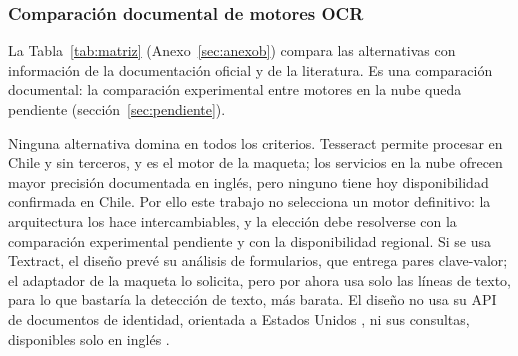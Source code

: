 \documentclass[11pt,a4paper]{article}
\begin{document}
\subsubsection{Comparación documental de motores OCR}
La Tabla~\ref{tab:matriz} (Anexo~\ref{sec:anexob}) compara las alternativas con información de la documentación oficial y de la literatura. Es una comparación documental: la comparación experimental entre motores en la nube queda pendiente (sección~\ref{sec:pendiente}).

Ninguna alternativa domina en todos los criterios. Tesseract permite procesar en Chile y sin terceros, y es el motor de la maqueta; los servicios en la nube ofrecen mayor precisión documentada en inglés, pero ninguno tiene hoy disponibilidad confirmada en Chile. Por ello este trabajo no selecciona un motor definitivo: la arquitectura los hace intercambiables, y la elección debe resolverse con la comparación experimental pendiente y con la disponibilidad regional. Si se usa Textract, el diseño prevé su análisis de formularios, que entrega pares clave-valor; el adaptador de la maqueta lo solicita, pero por ahora usa solo las líneas de texto, para lo que bastaría la detección de texto, más barata. El diseño no usa su API de documentos de identidad, orientada a Estados Unidos \cite{awsid}, ni sus consultas, disponibles solo en inglés \cite{awsfaq}.
\end{document}
